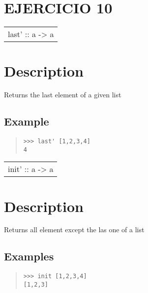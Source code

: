 \section{EJERCICIO 10}
\begin{haddockdesc}
\item[\begin{tabular}{@{}l}
last' :: {\char 91}a{\char 93} -> a
\end{tabular}]
{\haddockbegindoc
\section*{Description}
Returns the last element of a given list\par
\subsection*{Example}
\begin{quote}
{\haddockverb\begin{verbatim}
>>> last' [1,2,3,4]
4

\end{verbatim}}
\end{quote}}
\end{haddockdesc}
\begin{haddockdesc}
\item[\begin{tabular}{@{}l}
init' :: {\char 91}a{\char 93} -> {\char 91}a{\char 93}
\end{tabular}]
{\haddockbegindoc
\section*{Description}
Returns all element except the las one of a list\par
\subsection*{Examples}
\begin{quote}
{\haddockverb\begin{verbatim}
>>> init [1,2,3,4]
[1,2,3]

\end{verbatim}}
\end{quote}}
\end{haddockdesc}
